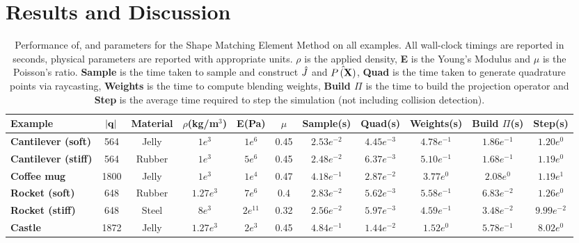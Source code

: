 %
\section{Results and Discussion}

\begin{table}[h]
  \caption{Performance of, and parameters for the Shape Matching Element Method on all examples. All wall-clock timings are reported in seconds, physical  parameters are
  reported with appropriate units. $\rho$ is the applied density, \textbf{E} is the  Young's Modulus and $\mu$ is the Poisson's ratio.
  \textbf{Sample} is the time taken to sample and construct $\hat{J}$ and $\hat{P\left(\mathbf{X}\right)}$, \textbf{Quad} is the time taken to generate quadrature points via raycasting,
  \textbf{Weights} is the time to compute blending weights, \textbf{Build $\Pi$} is the time to build the projection operator and  \textbf{Step} is the average time required to step the simulation (not including collision detection).
  }
  \label{tbl:perf}
  \begin{center}
  \begin{tabular}{l c c c c c c c c c c}
   \textbf{Example} & $|\mathbf{q}|$ & \textbf{Material}&  $\rho$(kg/m$^3$) & \textbf{E}(Pa) & $\mu$ &\textbf{Sample}(s) & \textbf{Quad}(s)& \textbf{Weights}(s) & \textbf{Build $\Pi$}(s)& \textbf{Step}(s)\\
   \hline 
   \rowcolor[HTML]{DAE8FC} 
   \textbf{Cantilever (soft)}       & 564 & Jelly & $1 e^3$ & $1e^6$& 0.45 & $2.53 e^{-2}$ & $4.45 e^{-3}$ & $4.78 e^{-1}$ & $1.86 e^{-1}$ & $1.20 e^{0}$ \\
   \textbf{Cantilever (stiff)}      & 564 & Rubber & $1 e^3$ & $5 e^6$ & 0.45 & $2.48 e^{-2}$ & $6.37 e^{-3}$ & $5.10 e^{-1}$ & $1.68 e^{-1}$ & $1.19 e^{0}$ \\
   \textbf{Coffee mug}              & 1800 & Jelly & $1 e^3$ & $1 e^4$ & 0.47 & $4.18 e^{-1}$ & $2.87 e^{-2}$ & $3.77 e^{0}$ & $2.08 e^{0}$ & $1.19 e^{1}$  \\
   \textbf{Rocket (soft)}           & 648 & Rubber & $1.27 e^3$ & $7 e^6$ & 0.4 & $2.83 e^{-2}$ & $5.62 e^{-3}$ & $5.58 e^{-1}$ & $6.83 e^{-2}$ & $1.26 e^{0}$ \\
   \textbf{Rocket (stiff)}          & 648 & Steel & $8 e^3$ & $2 e^{11}$ & 0.32 & $2.56 e^{-2}$ & $5.97 e^{-3}$ & $4.59 e^{-1}$ & $3.48 e^{-2}$ & $9.99 e^{-2}$ \\
   \textbf{Castle}                  & 1872 & Jelly & $1.27 e^3$ & $2 e^3$ & 0.45 & $4.84 e^{-1}$ & $1.44 e^{-2}$ & $1.52 e^{0}$ & $5.78 e^{-1}$ & $8.02 e^{0}$ \\

\end{tabular}
\end{center}
\end{table}
